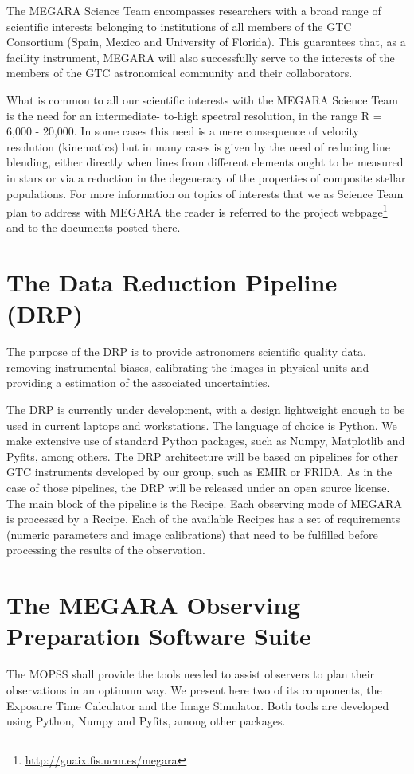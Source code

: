 The MEGARA Science Team encompasses researchers with a broad range of scientific
interests belonging to institutions of all members of the GTC Consortium (Spain, Mexico and University of
Florida). This guarantees that, as a facility instrument, MEGARA will also successfully serve to the interests of
the members of the GTC astronomical community and their collaborators.

What is common to all our scientific interests with the MEGARA Science Team is the need for an intermediate-
to-high spectral resolution, in the range R = 6,000 - 20,000. In some cases this need is a mere consequence of
velocity resolution (kinematics) but in many cases is given by the need of reducing line blending, either directly
when lines from different elements ought to be measured in stars or via a reduction in the degeneracy of the
properties of composite stellar populations.
For more information on topics of interests that we as Science Team plan to address with MEGARA the reader is referred to the project webpage\footnote{\url{http://guaix.fis.ucm.es/megara}} and to the documents posted there.

\section{The Data Reduction Pipeline (DRP)}
The purpose of the DRP is to provide astronomers scientific quality data,  removing instrumental biases, 
calibrating the images in physical units and providing a estimation of the associated uncertainties.

The DRP is currently under development, with a design lightweight enough to be 
used in current laptops and workstations. The language of choice is Python. We
make extensive use of standard Python packages, such as Numpy, Matplotlib and 
Pyfits, among others. The DRP architecture will be based on 
pipelines for other GTC instruments developed by our group, such as EMIR or 
FRIDA. As in the case of those pipelines, the DRP will be released
under an open source license. The main block of the pipeline is the Recipe. 
Each observing mode of MEGARA is processed by
a Recipe. Each of the available Recipes has a set of requirements 
(numeric parameters and image calibrations) that need to be fulfilled 
before processing the results of the observation. 

\section{The MEGARA Observing Preparation Software Suite}
The MOPSS shall provide the tools needed to assist observers to plan their observations in an optimum way. We present here two of its components, the Exposure Time Calculator and the Image Simulator. Both tools are developed using Python, Numpy and Pyfits, among other packages.

